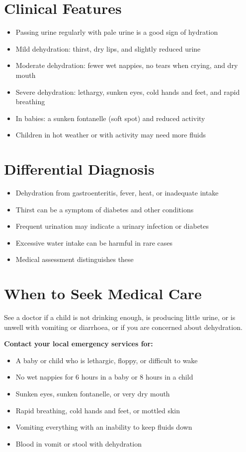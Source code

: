 \section*{Clinical Features}
\begin{itemize}
    \item Passing urine regularly with pale urine is a good sign of hydration
    \item Mild dehydration: thirst, dry lips, and slightly reduced urine
    \item Moderate dehydration: fewer wet nappies, no tears when crying, and dry mouth
    \item Severe dehydration: lethargy, sunken eyes, cold hands and feet, and rapid breathing
    \item In babies: a sunken fontanelle (soft spot) and reduced activity
    \item Children in hot weather or with activity may need more fluids
\end{itemize}

\section*{Differential Diagnosis}
\begin{itemize}
    \item Dehydration from gastroenteritis, fever, heat, or inadequate intake
    \item Thirst can be a symptom of diabetes and other conditions
    \item Frequent urination may indicate a urinary infection or diabetes
    \item Excessive water intake can be harmful in rare cases
    \item Medical assessment distinguishes these
\end{itemize}

\section*{When to Seek Medical Care}
See a doctor if a child is not drinking enough, is producing little urine, or is unwell with vomiting or diarrhoea, or if you are concerned about dehydration.

\textbf{Contact your local emergency services for:}
\begin{itemize}
    \item A baby or child who is lethargic, floppy, or difficult to wake
    \item No wet nappies for 6 hours in a baby or 8 hours in a child
    \item Sunken eyes, sunken fontanelle, or very dry mouth
    \item Rapid breathing, cold hands and feet, or mottled skin
    \item Vomiting everything with an inability to keep fluids down
    \item Blood in vomit or stool with dehydration
\end{itemize}

